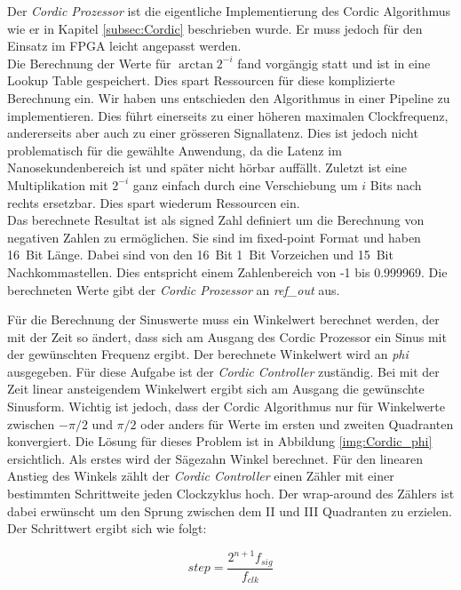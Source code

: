 Der \textit{Cordic Prozessor} ist die eigentliche Implementierung des Cordic Algorithmus wie er in Kapitel \ref{subsec:Cordic} beschrieben wurde. Er muss jedoch für den Einsatz im FPGA leicht angepasst werden. \\
Die Berechnung der Werte für \(\arctan{2^{-i}}\) fand vorgängig statt und ist in eine Lookup Table gespeichert. Dies spart Ressourcen für diese komplizierte Berechnung ein. Wir haben uns entschieden den Algorithmus in einer Pipeline zu implementieren. Dies führt einerseits zu einer höheren maximalen Clockfrequenz, andererseits aber auch zu einer grösseren Signallatenz. Dies ist jedoch nicht problematisch für die gewählte Anwendung, da die Latenz im Nanosekundenbereich ist und später nicht hörbar auffällt. Zuletzt ist eine Multiplikation mit \(2^{-i}\) ganz einfach durch eine Verschiebung um \(i\) Bits nach rechts ersetzbar. Dies spart wiederum Ressourcen ein.\\
Das berechnete Resultat ist als signed Zahl definiert um die Berechnung von negativen Zahlen zu ermöglichen. Sie sind im fixed-point Format und haben \SI{16}{Bit} Länge. Dabei sind von den \SI{16}{Bit} \SI{1}{Bit} Vorzeichen und \SI{15}{Bit} Nachkommastellen. Dies entspricht einem Zahlenbereich von -1 bis 0.999969. Die berechneten Werte gibt der \textit{Cordic Prozessor} an \textit{ref\_out} aus.

Für die Berechnung der Sinuswerte muss ein Winkelwert berechnet werden, der mit der Zeit so ändert, dass sich am Ausgang des Cordic Prozessor ein Sinus mit der gewünschten Frequenz ergibt. Der berechnete Winkelwert wird an \textit{phi} ausgegeben. Für diese Aufgabe ist der \textit{Cordic Controller} zuständig. Bei mit der Zeit linear ansteigendem Winkelwert ergibt sich am Ausgang die gewünschte Sinusform. Wichtig ist jedoch, dass der Cordic Algorithmus nur für Winkelwerte zwischen \(-\pi/2\) und \(\pi/2\) oder anders für Werte im ersten und zweiten Quadranten konvergiert. Die Lösung für dieses Problem ist in Abbildung \ref{img:Cordic_phi} ersichtlich. 
Als erstes wird der Sägezahn Winkel berechnet. Für den linearen Anstieg des Winkels zählt der \textit{Cordic Controller} einen Zähler mit einer bestimmten Schrittweite jeden Clockzyklus hoch. Der wrap-around des Zählers ist dabei erwünscht um den Sprung zwischen dem II und III Quadranten zu erzielen. Der Schrittwert ergibt sich wie folgt:

\begin{equation}
step = \frac{2^{n+1}f_{sig}}{f_{clk}}
\label{equ:cordic_step}
\end{equation} 

